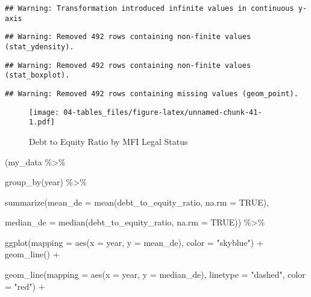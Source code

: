 \documentclass[a4paper,nobind]{templates/ociamthesis}
\newenvironment{Shaded}{\begin{snugshade}}{\end{snugshade}}
\newcommand{\AttributeTok}[1]{\textcolor[rgb]{0.77,0.63,0.00}{#1}}
\newcommand{\ConstantTok}[1]{\textcolor[rgb]{0.00,0.00,0.00}{#1}}
\newcommand{\FunctionTok}[1]{\textcolor[rgb]{0.00,0.00,0.00}{#1}}
\newcommand{\NormalTok}[1]{#1}
\newcommand{\SpecialCharTok}[1]{\textcolor[rgb]{0.00,0.00,0.00}{#1}}
\newcommand{\StringTok}[1]{\textcolor[rgb]{0.31,0.60,0.02}{#1}}
\renewenvironment{Shaded}
{
  \vspace{10pt}%
  \begin{snugshade}%
}{%
  \end{snugshade}%
  \vspace{8pt}%
}
\begin{document}
\begin{landscape}
\begin{verbatim}
## Warning: Transformation introduced infinite values in continuous y-axis
\end{verbatim}

\begin{verbatim}
## Warning: Removed 492 rows containing non-finite values (stat_ydensity).
\end{verbatim}

\begin{verbatim}
## Warning: Removed 492 rows containing non-finite values (stat_boxplot).
\end{verbatim}

\begin{verbatim}
## Warning: Removed 492 rows containing missing values (geom_point).
\end{verbatim}

\begin{figure}
\centering
\texttt{[image: 04-tables\_files/figure-latex/unnamed-chunk-41-1.pdf]}
\caption{\label{fig:unnamed-chunk-41}Debt to Equity Ratio by MFI Legal Status}
\end{figure}

\newpage

\begin{Shaded}
\begin{Highlighting}[]
\NormalTok{(my\_data }\SpecialCharTok{\%\textgreater{}\%} 
  
  \FunctionTok{group\_by}\NormalTok{(year) }\SpecialCharTok{\%\textgreater{}\%} 
  
  \FunctionTok{summarize}\NormalTok{(}\AttributeTok{mean\_de =} \FunctionTok{mean}\NormalTok{(debt\_to\_equity\_ratio, }\AttributeTok{na.rm =} \ConstantTok{TRUE}\NormalTok{), }
                               
  \AttributeTok{median\_de =} \FunctionTok{median}\NormalTok{(debt\_to\_equity\_ratio, }\AttributeTok{na.rm =} \ConstantTok{TRUE}\NormalTok{)) }\SpecialCharTok{\%\textgreater{}\%} 
  
  \FunctionTok{ggplot}\NormalTok{(}\AttributeTok{mapping =} \FunctionTok{aes}\NormalTok{(}\AttributeTok{x =}\NormalTok{ year, }\AttributeTok{y =}\NormalTok{ mean\_de), }\AttributeTok{color =} \StringTok{"skyblue"}\NormalTok{) }\SpecialCharTok{+} \FunctionTok{geom\_line}\NormalTok{() }\SpecialCharTok{+}
  
  \FunctionTok{geom\_line}\NormalTok{(}\AttributeTok{mapping =} \FunctionTok{aes}\NormalTok{(}\AttributeTok{x =}\NormalTok{ year, }\AttributeTok{y =}\NormalTok{ median\_de), }\AttributeTok{linetype =} \StringTok{"dashed"}\NormalTok{, }\AttributeTok{color =} \StringTok{"red"}\NormalTok{) }\SpecialCharTok{+}
  

\end{Highlighting}
\end{Shaded}
\end{landscape}
\end{document}
